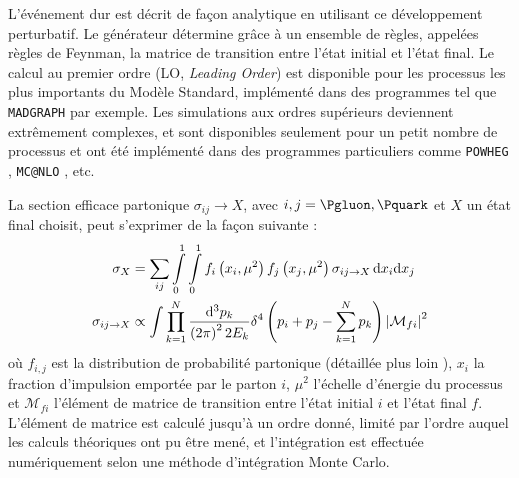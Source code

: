 L'événement dur est décrit de façon analytique en utilisant ce développement perturbatif. Le générateur détermine grâce à un ensemble de règles, appelées règles de Feynman, la matrice de transition entre l'état initial et l'état final. Le calcul au premier ordre (LO, \emph{Leading Order}) est disponible pour les processus les plus importants du Modèle Standard, implémenté dans des programmes tel que \texttt{MADGRAPH} \citep{madgraph} par exemple. Les simulations aux ordres supérieurs deviennent extrêmement complexes, et sont disponibles seulement pour un petit nombre de processus et ont été implémenté dans des programmes particuliers comme \texttt{POWHEG} \citep{Alioli:2010xd}, \texttt{MC@NLO} \citep{1126-6708-2002-06-029}, etc.

La section efficace partonique $\sigma_{ij} \rightarrow X$, avec $i, j = \Pgluon, \Pquark$ et $X$ un état final choisit, peut s'exprimer de la façon suivante :
\begin{align}
  \sigma_{X} &= \sum_{ij} \int \displaylimits_0^1 \int \displaylimits_0^1 f_i\left( x_i, \mu^2 \right) f_j\left(x_j, \mu^2\right) \sigma_{ij \rightarrow X}\, \mathrm{d}x_i \mathrm{d}x_j \\
  \sigma_{ij \rightarrow X} &\propto \int \prod \displaylimits_{k = 1}^{N} \frac{\mathrm{d}^3p_k}{\left( 2 \pi \right)^2 2 E_k} \delta^4\left( p_i + p_j - \sum_{k = 1}^{N} p_k \right) \left| \mathcal{M}_{fi} \right|^2
\end{align}
où $f_{i, j}$ est la distribution de probabilité partonique (détaillée plus loin ), $x_i$ la fraction d'impulsion emportée par le parton $i$, $\mu^2$ l'échelle d'énergie du processus et $\mathcal{M}_{fi}$ l'élément de matrice de transition entre l'état initial $i$ et l'état final $f$. L'élément de matrice est calculé jusqu'à un ordre donné, limité par l'ordre auquel les calculs théoriques ont pu être mené, et l'intégration est effectuée numériquement selon une méthode d'intégration Monte Carlo.


